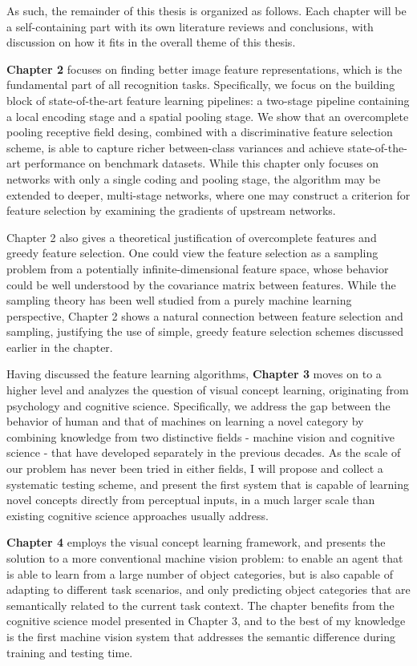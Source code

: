 As such, the remainder of this thesis is organized as follows. Each chapter will be a self-containing part with its own literature reviews and conclusions, with discussion on how it fits in the overall theme of this thesis.

{\bfseries Chapter 2} focuses on finding better image feature representations, which is the fundamental part of all recognition tasks. Specifically, we focus on the building block of state-of-the-art feature learning pipelines: a two-stage pipeline containing a local encoding stage and a spatial pooling stage. We show that an overcomplete pooling receptive field desing, combined with a discriminative feature selection scheme, is able to capture richer between-class variances and achieve state-of-the-art performance on benchmark datasets. While this chapter only focuses on networks with only a single coding and pooling stage, the algorithm may be extended to deeper, multi-stage networks, where one may construct a criterion for feature selection by examining the gradients of upstream networks.

Chapter 2 also gives a theoretical justification of overcomplete features and greedy feature selection. One could view the feature selection as a sampling problem from a potentially infinite-dimensional feature space, whose behavior could be well understood by the covariance matrix between features. While the \nystrom sampling theory has been well studied from a purely machine learning perspective, Chapter 2 shows a natural connection between feature selection and \nystrom sampling, justifying the use of simple, greedy feature selection schemes discussed earlier in the chapter.

Having discussed the feature learning algorithms, {\bfseries Chapter 3} moves on to a higher level and analyzes the question of visual concept learning, originating from psychology and cognitive science. Specifically, we address the gap between the behavior of human and that of machines on learning a novel category by combining knowledge from two distinctive fields - machine vision and cognitive science - that have developed separately in the previous decades. As the scale of our problem has never been tried in either fields, I will propose and collect a systematic testing scheme, and present the first system that is capable of learning novel concepts directly from perceptual inputs, in a much larger scale than existing cognitive science approaches usually address.

{\bfseries Chapter 4} employs the visual concept learning framework, and presents the solution to a more conventional machine vision problem: to enable an agent that is able to learn from a large number of object categories, but is also capable of adapting to different task scenarios, and only predicting object categories that are semantically related to the current task context. The chapter benefits from the cognitive science model presented in Chapter 3, and to the best of my knowledge is the first machine vision system that addresses the semantic difference during training and testing time.

